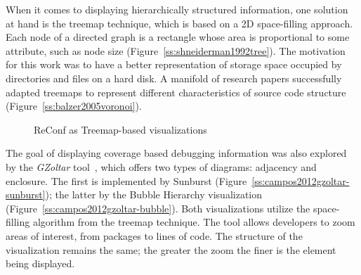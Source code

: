When it comes to displaying hierarchically structured information, one solution
at hand is the treemap technique, which is based on a 2D space-filling approach.
Each node of a directed graph is a rectangle whose area is proportional to some
attribute, such as node size (Figure~\ref{ss:shneiderman1992tree}). The
motivation for this work was to have a better representation of storage space
occupied by directories and files on a hard disk. A manifold of research papers
successfully adapted treemaps to represent different characteristics of source
code structure (Figure~\ref{ss:balzer2005voronoi}).

\begin{figure}
    \centering
    \caption{ReConf as Treemap-based visualizations}
\end{figure}

The goal of displaying coverage based debugging information was also explored by
the \textit{GZoltar} tool~\cite{campos2012gzoltar}, which offers two types of
diagrams:
adjacency and enclosure. The first is implemented by Sunburst
(Figure~\ref{ss:campos2012gzoltar-sunburst}); the latter by the Bubble Hierarchy
visualization (Figure~\ref{ss:campos2012gzoltar-bubble}). Both visualizations
utilize the space-filling algorithm from the treemap technique. The tool allows
developers to zoom areas of interest, from packages to  lines of code. The
structure of the visualization remains the same; the greater the zoom the finer
is the element being displayed.

